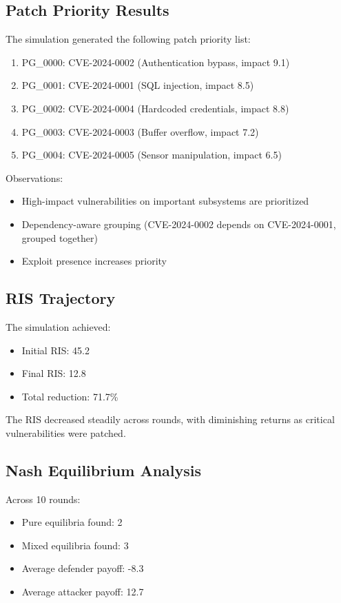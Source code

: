 \documentclass[conference]{IEEEtran}
\begin{document}
\subsection{Patch Priority Results}
The simulation generated the following patch priority list:
\begin{enumerate}
    \item PG\_0000: CVE-2024-0002 (Authentication bypass, impact 9.1)
    \item PG\_0001: CVE-2024-0001 (SQL injection, impact 8.5)
    \item PG\_0002: CVE-2024-0004 (Hardcoded credentials, impact 8.8)
    \item PG\_0003: CVE-2024-0003 (Buffer overflow, impact 7.2)
    \item PG\_0004: CVE-2024-0005 (Sensor manipulation, impact 6.5)
\end{enumerate}

Observations:
\begin{itemize}
    \item High-impact vulnerabilities on important subsystems are prioritized
    \item Dependency-aware grouping (CVE-2024-0002 depends on CVE-2024-0001, grouped together)
    \item Exploit presence increases priority
\end{itemize}

\subsection{RIS Trajectory}
The simulation achieved:
\begin{itemize}
    \item Initial RIS: 45.2
    \item Final RIS: 12.8
    \item Total reduction: 71.7\%
\end{itemize}

The RIS decreased steadily across rounds, with diminishing returns as critical vulnerabilities were patched.

\subsection{Nash Equilibrium Analysis}
Across 10 rounds:
\begin{itemize}
    \item Pure equilibria found: 2
    \item Mixed equilibria found: 3
    \item Average defender payoff: -8.3
    \item Average attacker payoff: 12.7
\end{itemize}
\end{document}
